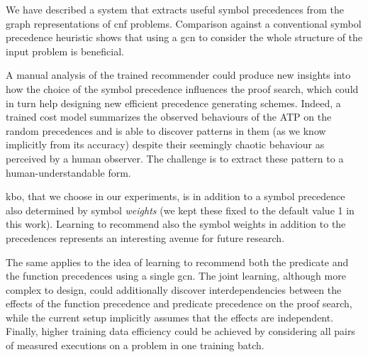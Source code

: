 We have described a system that extracts useful symbol precedences from the graph representations of \gls{cnf} problems.
Comparison against a conventional symbol precedence heuristic shows that using a \gls{gcn}
to consider the whole structure of the input problem is beneficial.

A manual analysis of the trained recommender could produce new insights into how the choice of the symbol precedence influences the proof search,
which could in turn help designing new efficient precedence generating schemes.
Indeed, a trained cost model summarizes the observed behaviours of the ATP on the random precedences
and is able to discover patterns in them (as we know implicitly from its accuracy) 
despite their seemingly chaotic behaviour as perceived by a human observer.
The challenge is to extract these pattern to a human-understandable form.

\gls{kbo}, that we choose in our experiments, is in addition to a symbol precedence
also determined by symbol \emph{weights} (we kept these fixed to the default value 1 in this work).
Learning to recommend also the symbol weights in addition to the precedences
represents an interesting avenue for future research.

The same applies to the idea of learning to recommend 
both the predicate and the function precedences using a single \gls{gcn}.
The joint learning, although more complex to design, could 
additionally discover interdependencies
between the effects of the function precedence and predicate precedence on the proof search,
while the current setup implicitly assumes that the effects are independent.
Finally, higher training data efficiency could be achieved by considering all pairs of measured executions on a problem
in one training batch.


